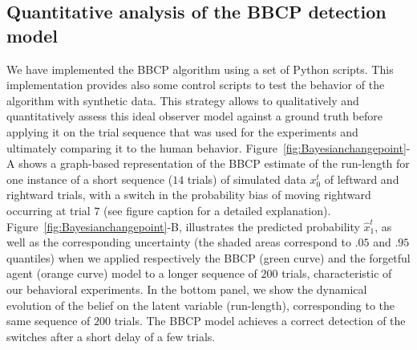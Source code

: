 \documentclass[10pt,letterpaper]{article}
\newcommand{\seeFig}[1]{Figure~\ref{fig:#1}}
\newcommand{\seeApp}[1]{Appendix}
\newcommand{\CP}[1]{\textbf{\textcolor{green}{[CP: #1]}}}
\begin{document}
\subsection*{Quantitative analysis of the BBCP detection model}
We have implemented
the BBCP algorithm %
using a set of Python scripts.
This implementation provides also some control scripts
to test the behavior of the algorithm with synthetic data.
This strategy allows to qualitatively and quantitatively assess
this ideal observer model against a ground truth before applying it
on the trial sequence that was used for the experiments and
ultimately comparing it to the human behavior. %
\seeFig{Bayesianchangepoint}-A shows a graph-based representation of the BBCP estimate of the run-length for one instance of a short sequence ($14$ trials) of simulated data $x_0^t$
of leftward and rightward trials, with a switch in the probability bias
of moving rightward occurring at trial $7$ (see figure caption for a detailed explanation).
\seeFig{Bayesianchangepoint}-B, illustrates the predicted probability $\hat{x}_1^t$, as well as the corresponding uncertainty (the shaded areas correspond to $.05$ and $.95$ quantiles) when
we applied respectively the BBCP (green curve) and the forgetful agent (orange curve) model to
a longer sequence of $200$ trials,
characteristic of our behavioral experiments.
In the bottom panel,
we show the dynamical evolution of the belief on the latent variable (run-length),
corresponding to the same sequence of $200$ trials.
The BBCP model achieves a correct detection of the switches after a short delay of a few trials.
\end{document}

